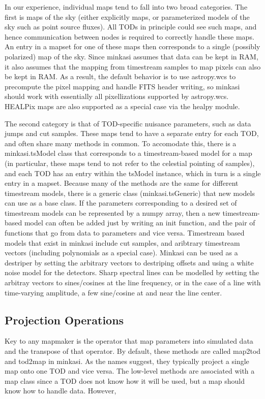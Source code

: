 \documentclass[12]{article}
\begin{document}
In our experience, individual maps tend to fall into two broad
categories.  The first is maps of the sky (either explicitly maps, or
parameterized models of the sky such as point source fluxes).  All
TODs in principle could see such maps, and hence communication between
nodes is required to correctly handle these maps.  An entry in a
mapset for one of these maps then corresponds to a single (possibly
polarized) map of the sky.  Since minkasi assumes that data can be
kept in RAM, it also assumes that the mapping from timestream samples
to map pixels can also be kept in RAM.  As a result, the default
behavior is to use astropy.wcs to precompute the pixel mapping and
handle FITS header writing, so minkasi should work with essentially
all pixellizations supported by astropy.wcs.  HEALPix maps are also
supported as a special case via the healpy module.  

The second category is that of TOD-specific nuisance parameters, such
as data jumps and cut samples.  These maps tend to have a separate
entry for each TOD, and often share many methods in common.  To
accomodate this, there is a minkasi.tsModel class that corresponds to a
timestream-based model for a map (in particular, these maps tend to
not refer to the celestial pointing of samples), and each TOD has an
entry within the tsModel instance, which in turn is a single entry in
a mapset.  Because many of the methods are the same for different
timestream models, there is a generic class (minkasi.tsGeneric) that
new models can use as a base class.  If the parameters corresponding
to a desired set of timestream models can be represented by a numpy
array, then a new timestream-based model can often be added just by
writing an init function, and the pair of functions that go from data
to parameters and vice versa.  Timestream based models that exist in
minkasi include cut samples, and aribtrary timestream vectors (including
polynomials as a special case).  Minkasi can be used as a destriper by
setting the arbitrary vectors to destriping offsets and using a white
noise model for the detectors.  Sharp spectral lines can be modelled
by setting the arbitray vectors to sines/cosines at the line
frequency, or in the case of a line with time-varying amplitude, a few
sine/cosine at and near the line center.  


\subsection{Projection Operations}

Key to any mapmaker is the operator that map parameters into simulated
data and the transpose of that operator.  By default, these methods
are called map2tod and tod2map in minkasi.  As the names suggest, they
typically project a single map onto one TOD and vice versa.  The
low-level methods are associated with a map class since a TOD does not
know how it will be used, but a map should know how to handle data.
However, 
\end{document}
